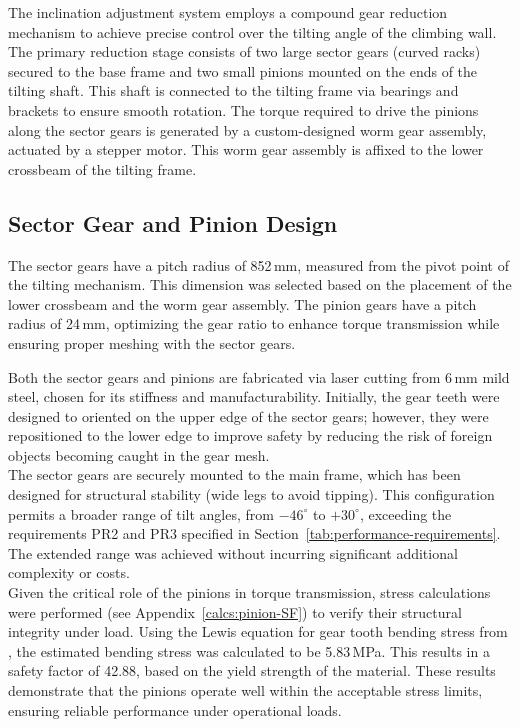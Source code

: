 The inclination adjustment system employs a compound gear reduction mechanism to achieve precise control over the tilting angle of the climbing wall. The primary reduction stage consists of two large sector gears (curved racks) secured to the base frame and two small pinions mounted on the ends of the tilting shaft. This shaft is connected to the tilting frame via bearings and brackets to ensure smooth rotation. The torque required to drive the pinions along the sector gears is generated by a custom-designed worm gear assembly, actuated by a stepper motor. This worm gear assembly is affixed to the lower crossbeam of the tilting frame.

\subsection{Sector Gear and Pinion Design}

The sector gears have a pitch radius of 852\,mm, measured from the pivot point of the tilting mechanism. This dimension was selected based on the placement of the lower crossbeam and the worm gear assembly. The pinion gears have a pitch radius of 24\,mm, optimizing the gear ratio to enhance torque transmission while ensuring proper meshing with the sector gears.

Both the sector gears and pinions are fabricated via laser cutting from 6\,mm mild steel, chosen for its stiffness and manufacturability. Initially, the gear teeth were designed to oriented on the upper edge of the sector gears; however, they were repositioned to the lower edge to improve safety by reducing the risk of foreign objects becoming caught in the gear mesh.\\

The sector gears are securely mounted to the main frame, which has been designed for structural stability (wide legs to avoid tipping). This configuration permits a broader range of tilt angles, from $-46^\circ$ to $+30^\circ$, exceeding the requirements PR2 and PR3 specified in Section~\ref{tab:performance-requirements}. The extended range was achieved without incurring significant additional complexity or costs.\\

Given the critical role of the pinions in torque transmission, stress calculations were performed (see Appendix~\ref{calcs:pinion-SF}) to verify their structural integrity under load. Using the Lewis equation for gear tooth bending stress from \cite{budynas2015shigley}, the estimated bending stress was calculated to be 5.83\,MPa. This results in a safety factor of 42.88, based on the yield strength of the material. These results demonstrate that the pinions operate well within the acceptable stress limits, ensuring reliable performance under operational loads.


